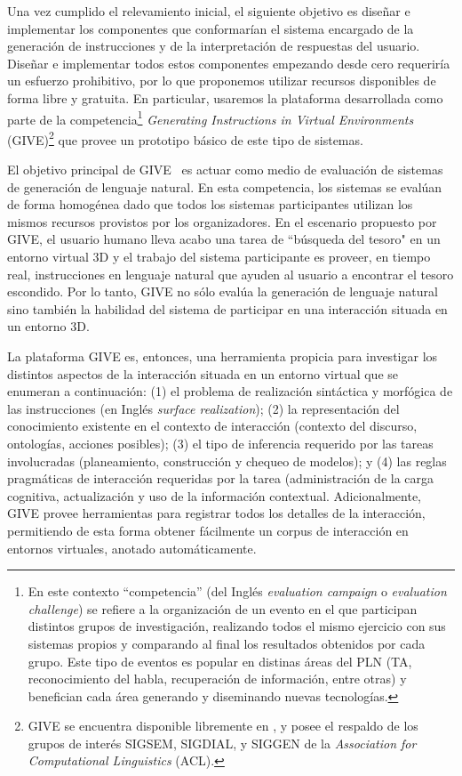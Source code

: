 Una vez cumplido el relevamiento inicial, el siguiente objetivo es
dise\~nar e implementar los componentes que
conformar\'ian el sistema encargado de la generaci\'on de instrucciones
y de la interpretaci\'on de respuestas del usuario.
Dise\~nar e implementar todos estos componentes empezando desde cero
requerir\'ia un esfuerzo prohibitivo, por lo que proponemos utilizar recursos
disponibles de forma libre y gratuita. En particular, usaremos la plataforma
desarrollada como parte de la competencia\footnote{En este contexto
``competencia'' (del Ingl\'es \emph{evaluation campaign} o \emph{evaluation challenge})
se refiere a la organizaci\'on de un evento en el que participan distintos
grupos de investigaci\'on, realizando todos el mismo ejercicio con sus sistemas
propios y comparando al final los resultados obtenidos por cada grupo. Este tipo
de eventos es popular en distinas \'areas del PLN (TA, reconocimiento del
habla, recuperaci\'on de informaci\'on, entre otras) y benefician
cada \'area generando y diseminando nuevas
tecnolog\'ias.} \textit{Generating Instructions in Virtual Environments}
(GIVE)\footnote{GIVE se encuentra disponible libremente en
, y posee el respaldo de los grupos de
inter\'es SIGSEM, SIGDIAL, y SIGGEN de la \emph{Association for Computational
Linguistics} (ACL).} que
provee un prototipo b\'asico de este tipo de sistemas.

El objetivo principal de GIVE~\citep{byron09} es actuar como medio de
evaluaci\'on de sistemas de generaci\'on
de lenguaje natural. En esta competencia, los sistemas se eval\'uan de forma
homog\'enea dado que todos los sistemas participantes utilizan los mismos
recursos provistos por los organizadores.
En el escenario propuesto por GIVE, el usuario
humano lleva acabo una tarea de ``b\'usqueda del tesoro" en un entorno
virtual 3D y el trabajo del sistema participante es proveer, en tiempo
real, instrucciones en lenguaje natural que ayuden al usuario
a encontrar el tesoro escondido.  Por lo tanto, GIVE no s\'olo eval\'ua
la generaci\'on de lenguaje natural sino tambi\'en la habilidad del
sistema de participar en una interacci\'on situada en un entorno 3D.

La plataforma GIVE es, entonces, una herramienta propicia para
investigar los distintos aspectos de la interacci\'on situada en un entorno
virtual que se enumeran a continuaci\'on: (1) el problema de realizaci\'on
sint\'actica y morf\'ogica de las
instrucciones (en Ingl\'es \emph{surface realization});
(2) la representaci\'on del conocimiento existente en el contexto de
interacci\'on (contexto del discurso, ontolog\'ias, acciones posibles); (3)
el tipo de inferencia requerido por las tareas involucradas
(planeamiento, construcci\'on y chequeo de modelos); y (4)
las reglas pragm\'aticas de interacci\'on requeridas por la tarea
(administraci\'on de la carga cognitiva, actualizaci\'on y uso de la
informaci\'on contextual. Adicionalmente, GIVE provee
herramientas para registrar todos los detalles de la
interacci\'on, permitiendo de esta forma obtener f\'acilmente un corpus de
interacci\'on en entornos virtuales, anotado autom\'aticamente.

